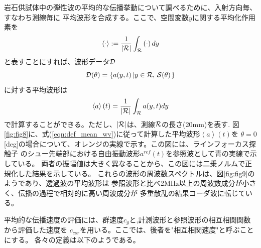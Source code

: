 岩石供試体中の弾性波の平均的な伝播挙動について調べるために、入射方向毎、すなわち測線毎に
平均波形を合成する。ここで、空間変数$y$に関する平均化作用素を
\begin{equation}
	\left< \cdot \right> := 
	\frac{1}{ \left| {\cal R} \right| }\int_{\cal R}\left( \cdot \right)dy
	\label{eqn:averaging}
\end{equation}
と表すことにすれば、波形データ${\cal D}$
\begin{equation}
	{\cal D}(\theta)=\left\{ a(y,t) \left| y\in {\cal R}, \, {\cal S}(\theta)\right.\right\}
	\label{eqn:}
\end{equation}
に対する平均波形は
\begin{equation}
	\left< a\right>(t)=
	\frac{1}{\left| {\cal R}\right|}\int_{\cal R}a(y,t)dy
	\label{eqn:def_mean_wv}
\end{equation}
で計算することができる。ただし、$\left| {\cal R }\right|$は、測線$\cal R$の長さ(20mm)を表す.
図\ref{fig:fig8}に、式(\ref{eqn:def_mean_wv})に従って計算した平均波形$\left<a \right>(t)$を
$\theta=0$[deg]の場合について、オレンジの実線で示す。この図には、ラインフォーカス探触子
のシュー先端部における自由振動波形$a^{ref}(t)$を参照波として青の実線で示している。
両者の振幅値は大きく異なることから、この図には二乗ノルムで正規化した結果を示している。
これらの波形の周波数スペクトルは、図\ref{fig:fig9}のようであり、透過波の平均波形は
参照波形と比べ2MHz以上の周波数成分が小さく、伝播の過程で相対的に高い周波成分が
多重散乱の結果コーダ波に転じている。

平均的な伝播速度の評価には、群速度$c_g$と,計測波形と参照波形の相互相関関数から評価した速度を
$c_{cor}$を用いる。ここでは、後者を"相互相関速度"と呼ぶことにする。
各々の定義は以下のようである。
